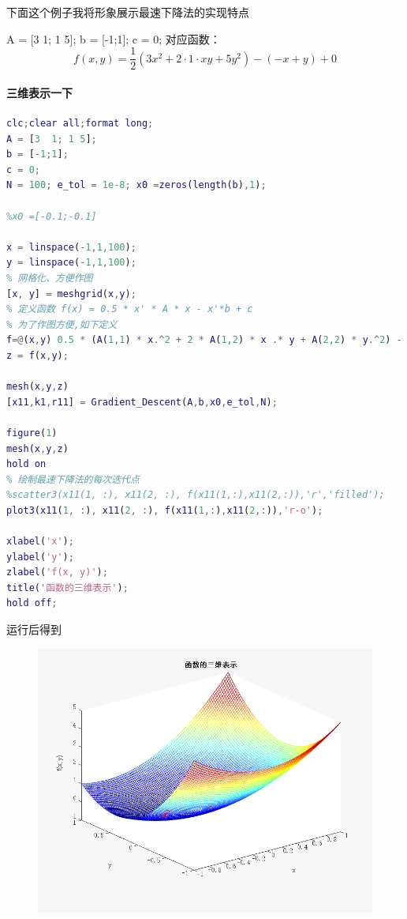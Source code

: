 \documentclass{xtupaper}
\begin{document}
\newpage
下面这个例子我将形象展示最速下降法的实现特点
\begin{example}
  A = [3  1; 1 5]; 
b = [-1;1];
c = 0; 
对应函数：$$f(x,y)=\frac{1}{2}\left(3x^2+2\cdot1\cdot xy+5y^2\right)-(-x+y)+0$$
\end{example}

\paragraph{三维表示一下}
\begin{lstlisting}[language=matlab]
clc;clear all;format long;
A = [3  1; 1 5]; 
b = [-1;1];
c = 0; 
N = 100; e_tol = 1e-8; x0 =zeros(length(b),1);

%x0 =[-0.1;-0.1]

x = linspace(-1,1,100); 
y = linspace(-1,1,100);
% 网格化、方便作图
[x, y] = meshgrid(x,y);
% 定义函数 f(x) = 0.5 * x' * A * x - x'*b + c
% 为了作图方便,如下定义
f=@(x,y) 0.5 * (A(1,1) * x.^2 + 2 * A(1,2) * x .* y + A(2,2) * y.^2) - (b(1) * x + b(2) * y) + c;
z = f(x,y);

mesh(x,y,z)
[x11,k1,r11] = Gradient_Descent(A,b,x0,e_tol,N);

figure(1)
mesh(x,y,z)
hold on
% 绘制最速下降法的每次迭代点
%scatter3(x11(1, :), x11(2, :), f(x11(1,:),x11(2,:)),'r','filled');
plot3(x11(1, :), x11(2, :), f(x11(1,:),x11(2,:)),'r-o');

xlabel('x');
ylabel('y');
zlabel('f(x, y)');
title('函数的三维表示');
hold off;
\end{lstlisting}
运行后得到
\begin{figure}[htpb]
  \centering
  \includegraphics[scale=0.5]{../figures/fig3.png}
  \caption{}
\end{figure}
\end{document}
